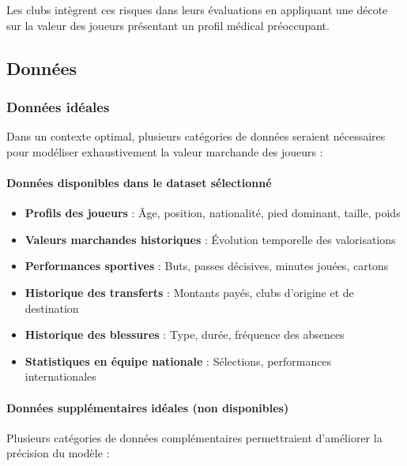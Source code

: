 \documentclass[12pt,a4paper]{article}
\begin{document}
Les clubs intègrent ces risques dans leurs évaluations en appliquant une décote sur la valeur des joueurs présentant un profil médical préoccupant.

\newpage

\subsection{Données}

\subsubsection{Données idéales}

Dans un contexte optimal, plusieurs catégories de données seraient nécessaires pour modéliser exhaustivement la valeur marchande des joueurs :

\paragraph{Données disponibles dans le dataset sélectionné}

\begin{itemize}[leftmargin=*]
    \item \textbf{Profils des joueurs} : Âge, position, nationalité, pied dominant, taille, poids
    \item \textbf{Valeurs marchandes historiques} : Évolution temporelle des valorisations
    \item \textbf{Performances sportives} : Buts, passes décisives, minutes jouées, cartons
    \item \textbf{Historique des transferts} : Montants payés, clubs d'origine et de destination
    \item \textbf{Historique des blessures} : Type, durée, fréquence des absences
    \item \textbf{Statistiques en équipe nationale} : Sélections, performances internationales
\end{itemize}

\paragraph{Données supplémentaires idéales (non disponibles)}

Plusieurs catégories de données complémentaires permettraient d'améliorer la précision du modèle :
\end{document}
